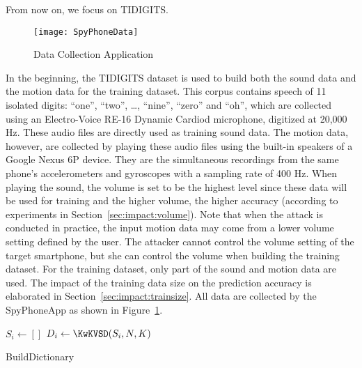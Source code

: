 From now on, we focus on TIDIGITS.


\begin{figure}[H]
	\centering
	\texttt{[image: SpyPhoneData]}
	\caption{{\spp} Data Collection Application}
	\label{fig:spyphoneapp}
\end{figure}

In the beginning, the TIDIGITS dataset is used to build both the sound data and the motion data for the training dataset.
%
This corpus contains speech of 11 isolated digits: ``one'', ``two'', \ldots, ``nine'', ``zero'' and ``oh'', which are collected using an Electro-Voice RE-16 Dynamic Cardiod microphone, digitized at 20,000 Hz.
%
These audio files are directly used as training sound data. 
The motion data, however, are collected by playing these audio files using the built-in speakers of a Google Nexus 6P device. They are the simultaneous recordings from the same phone's  accelerometers and gyroscopes with a sampling rate of 400 Hz.
When playing the sound, the volume is set to be the highest level since these data will be used for training and the higher volume, the higher accuracy (according to experiments in Section~\ref{sec:impact:volume}).
Note that when the {\attackName} attack is conducted in practice, the input motion data may come from a lower volume setting defined by the user. The attacker cannot control the volume setting of the target smartphone, but she can control the volume when building the training dataset. 
%
For the training dataset, only part of the sound and motion data are used. The impact of the training data size on the prediction accuracy is elaborated in Section~\ref{sec:impact:trainsize}.
All data are collected by the SpyPhoneApp as shown in Figure~\ref{fig:spyphoneapp}.



 \begin{algorithm}[!t]
	\small
	\DontPrintSemicolon
	\LinesNumbered
	$ S_i \leftarrow []$  
	$D_i \leftarrow \KwKVSD(S_i, N, K)$
	\caption{{BuildDictionary}\label{algo:builddic}}
\end{algorithm}

